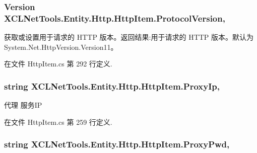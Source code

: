 \subsubsection[{\texorpdfstring{Protocol\+Version}{ProtocolVersion}}]{\setlength{\rightskip}{0pt plus 5cm}Version X\+C\+L\+Net\+Tools.\+Entity.\+Http.\+Http\+Item.\+Protocol\+Version\hspace{0.3cm}{\ttfamily [get]}, {\ttfamily [set]}}\hypertarget{class_x_c_l_net_tools_1_1_entity_1_1_http_1_1_http_item_abc953d2639ee034855449932ebc6c7bb}{}\label{class_x_c_l_net_tools_1_1_entity_1_1_http_1_1_http_item_abc953d2639ee034855449932ebc6c7bb}


获取或设置用于请求的 H\+T\+TP 版本。返回结果\+:用于请求的 H\+T\+TP 版本。默认为 System.\+Net.\+Http\+Version.\+Version11。 



在文件 Http\+Item.\+cs 第 292 行定义.

\subsubsection[{\texorpdfstring{Proxy\+Ip}{ProxyIp}}]{\setlength{\rightskip}{0pt plus 5cm}string X\+C\+L\+Net\+Tools.\+Entity.\+Http.\+Http\+Item.\+Proxy\+Ip\hspace{0.3cm}{\ttfamily [get]}, {\ttfamily [set]}}\hypertarget{class_x_c_l_net_tools_1_1_entity_1_1_http_1_1_http_item_a596fad85d4a97f4b60e16ec7b1f90eaf}{}\label{class_x_c_l_net_tools_1_1_entity_1_1_http_1_1_http_item_a596fad85d4a97f4b60e16ec7b1f90eaf}


代理 服务\+IP 



在文件 Http\+Item.\+cs 第 259 行定义.

\subsubsection[{\texorpdfstring{Proxy\+Pwd}{ProxyPwd}}]{\setlength{\rightskip}{0pt plus 5cm}string X\+C\+L\+Net\+Tools.\+Entity.\+Http.\+Http\+Item.\+Proxy\+Pwd\hspace{0.3cm}{\ttfamily [get]}, {\ttfamily [set]}}\hypertarget{class_x_c_l_net_tools_1_1_entity_1_1_http_1_1_http_item_a5510717d2cace964bdc2a7450da2c4a3}{}\label{class_x_c_l_net_tools_1_1_entity_1_1_http_1_1_http_item_a5510717d2cace964bdc2a7450da2c4a3}


